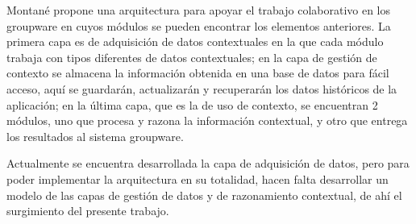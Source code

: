 Montan\'e \cite{montane2013context} propone una arquitectura para apoyar el trabajo colaborativo en los groupware en cuyos m\'odulos se pueden encontrar los elementos anteriores. La primera capa es de adquisici\'on de datos contextuales en la que cada m\'odulo trabaja con tipos diferentes de datos contextuales; en la capa de gesti\'on de contexto se almacena la informaci\'on obtenida en una base de datos para f\'acil acceso, aqu\'i se guardar\'an, actualizar\'an y recuperar\'an los datos hist\'oricos de la aplicaci\'on; en la \'ultima capa, que es la de uso de contexto, se encuentran 2 m\'odulos, uno que procesa y razona la informaci\'on contextual, y otro que entrega los resultados al sistema groupware.

Actualmente se encuentra desarrollada la capa de adquisici\'on de datos, pero para poder implementar la arquitectura en su totalidad, hacen falta desarrollar un modelo de las capas de gesti\'on de datos y de razonamiento contextual, de ah\'i el surgimiento del presente trabajo.

